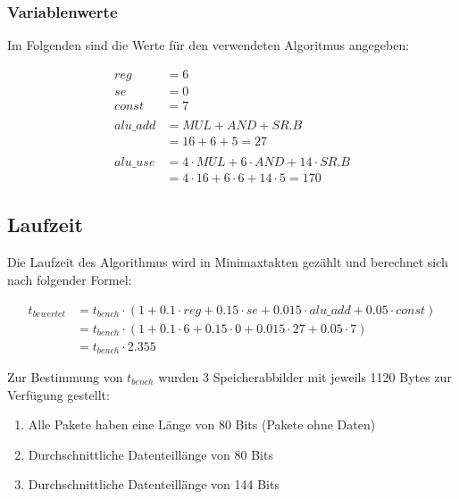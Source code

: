 \subsubsection{Variablenwerte}
\label{subsubsection:Dokumentation-BenchmarkBewertung-Berechnung-Variablen-Variablenwerte}

Im Folgenden sind die Werte für den verwendeten Algoritmus angegeben:

\begin{align*}
    reg      &= 6 \\
    se       &= 0 \\
    const    &= 7 \\ \\
    alu\_add &= MUL + AND + SR.B \\
             &= 16 + 6 + 5 = 27 \\ \\
    alu\_use &= 4 \cdot MUL + 6 \cdot AND + 14 \cdot SR.B \\
             &= 4 \cdot 16 + 6 \cdot 6 + 14 \cdot 5 = 170
\end{align*}

\subsection{Laufzeit}
\label{subsection:Dokumentation-BenchmarkBewertung-Berechnung-Laufzeit}

Die Laufzeit des Algorithmus wird in Minimaxtakten gezählt und berechnet sich nach folgender Formel:

\begin{align*}
    t_{bewertet} &= t_{bench} \cdot (1 + 0.1 \cdot reg + 0.15 \cdot se + 0.015 \cdot alu\_add + 0.05 \cdot const) \\
                 &= t_{bench} \cdot (1 + 0.1 \cdot 6 + 0.15 \cdot 0 + 0.015 \cdot 27 + 0.05 \cdot 7) \\
                 &= t_{bench} \cdot 2.355
\end{align*}

Zur Bestimmung von $t_{bench}$ wurden 3 Speicherabbilder mit jeweils 1120 Bytes zur Verfügung gestellt:

\begin{enumerate}
    \item Alle Pakete haben eine Länge von 80 Bits (Pakete ohne Daten)
    \item Durchschnittliche Datenteillänge von 80 Bits
    \item Durchschnittliche Datenteillänge von 144 Bits
\end{enumerate}


